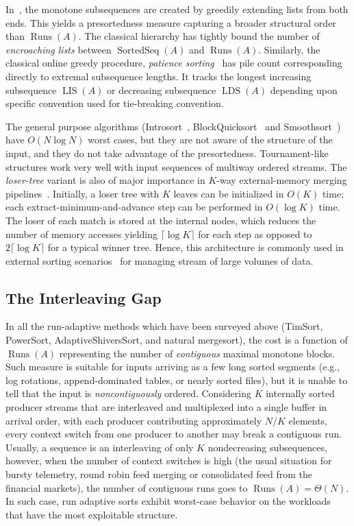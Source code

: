 \documentclass{ieeeaccess}
\theoremstyle{plain}
\theoremstyle{definition}
\DeclareMathOperator{\Runs}{Runs}
\DeclareMathOperator{\SortedSeq}{SortedSeq}
\begin{document}
In~\cite{Skiena1988}, the monotone subsequences are created by greedily extending lists from both ends. This yields a presortedness measure capturing a broader structural order than $\Runs(A)$. The classical hierarchy has tightly bound the number of \emph{encroaching lists} between $\SortedSeq(A)$ and $\Runs(A)$. Similarly, the classical online greedy procedure, \emph{patience sorting}~\cite{AldousDiaconis1999} has pile count corresponding directly to extremal subsequence lengths. It tracks the longest increasing subsequence $\operatorname{LIS}(A)$ or decreasing subsequence $\operatorname{LDS}(A)$ depending upon specific convention used for tie-breaking convention.

The general purpose algorithms (Introsort~\cite{Musser1997, CLRS2022}, BlockQuicksort~\cite{Edelkamp2016} and Smoothsort~\cite{Dijkstra1981}) have $O(N \log N)$ worst cases, but they are not aware of the structure of the input, and they do not take advantage of the presortedness. Tournament-like structures work very well with input sequences of multiway ordered streams. The \emph{loser-tree} variant is also of major importance in $K$-way external-memory merging pipelines~\cite{Knuth1998}. Initially, a loser tree with $K$ leaves can be initialized in $O(K)$ time; each extract-minimum-and-advance step can be performed in $O(\log K)$ time. The loser of each match is stored at the internal nodes, which reduces the number of memory accesses yielding $\lceil \log K \rceil$ for each step as opposed to $2\lceil \log K\rceil$ for a typical winner tree. Hence, this architecture is commonly used in external sorting scenarios~\cite{Aggarwal1988,Polyntsov2022} for managing stream of large volumes of data.


\subsection{The Interleaving Gap}
\label{sec:interleaving_gap}

In all the run-adaptive methods which have been surveyed above (TimSort, PowerSort, AdaptiveShiversSort, and natural mergesort), the cost is a function of $\Runs(A)$ representing the number of \emph{contiguous} maximal monotone blocks. Such measure is suitable for inputs arriving as a few long sorted segments (e.g., log rotations, append-dominated tables, or nearly sorted files), but it is unable to tell that the input is \emph{noncontiguously} ordered. Considering $K$ internally sorted producer streams that are interleaved and multiplexed into a single buffer in arrival order, with each producer contributing approximately $N/K$ elements, every context switch from one producer to another may break a contiguous run. Usually, a sequence is an interleaving of only $K$ nondecreasing subsequences, however, when the number of context switches is high (the usual situation for bursty telemetry, round robin feed merging or consolidated feed from the financial markets), the number of contiguous runs goes to $\Runs(A) = \Theta(N)$. In such case, run adaptive sorts exhibit worst-case behavior on the workloads that have the most exploitable structure.
\end{document}
